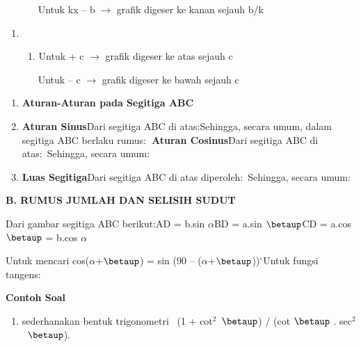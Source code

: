 \documentclass[11pt,fleqn]{book} %
\begin{document}
\begin{myEnumerate}
\begin{itemize}
\noindent ~~~~~~ Untuk kx -- b $\mathrm{\to}$ grafik digeser ke kanan sejauh b/k

\begin{enumerate}
\item \begin{enumerate}
\item  Untuk + c $\mathrm{\to}$ grafik digeser ke atas sejauh c
\end{enumerate}
\end{enumerate}

\noindent ~~~~~~ Untuk -- c $\mathrm{\to}$ grafik digeser ke bawah sejauh c

\begin{enumerate}
\item  \textbf{Aturan-Aturan pada Segitiga ABC}

\item  \textbf{Aturan Sinus}Dari segitiga ABC di atas:Sehingga, secara umum, dalam segitiga ABC berlaku rumus:\textbf{~Aturan Cosinus}Dari segitiga ABC di atas:~Sehingga, secara umum:

\item  \textbf{Luas Segitiga}Dari segitiga ABC di atas diperoleh:~Sehingga, secara umum: 
\end{enumerate}

\noindent \textbf{B. RUMUS JUMLAH DAN SELISIH SUDUT}

\noindent Dari gambar segitiga ABC berikut:AD = b.sin $\alpha$BD = a.sin $\betaup$CD = a.cos $\betaup$ = b.cos $\alpha$

\noindent Untuk mencari cos($\alpha$+$\betaup$) = sin (90 -- ($\alpha$+$\betaup$))${}^\circ$Untuk fungsi tangens:\textbf{}

\noindent \textbf{Contoh Soal}

\begin{enumerate}
\item \textbf{ }sederhanakan bentuk trigonometri~ (1 + cot${}^{2}$~$\betaup$) / (cot $\betaup$ . sec${}^{2}$~$\betaup$).
\end{enumerate}


\end{itemize}
\end{myEnumerate}
\end{document}
